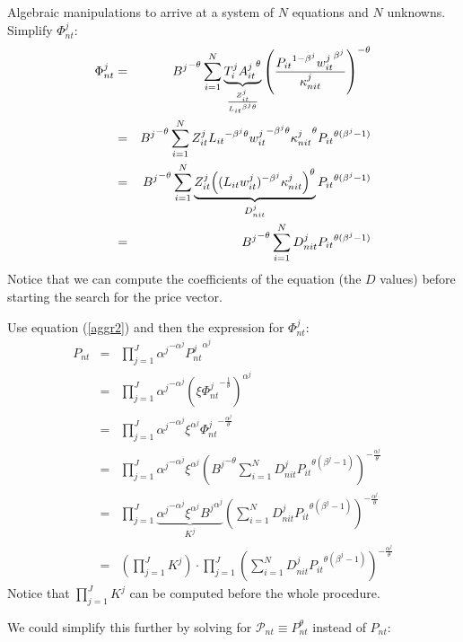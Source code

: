 \documentclass[12pt]{article}
\begin{document}
Algebraic manipulations to arrive at a system of $N$ equations and $N$
unknowns. Simplify $\Phi_{nt}^j:$ 
\begin{eqnarray*}
\Phi_{nt}^j &=& {B^j}^{-\theta} \sum_{i = 1}^N \underbrace{T_i^j {A_{it}^j}%
^{\theta}}_{\frac{Z_{it}^j}{{L_{it}}^{\beta^j\theta}}} \left(\frac{{P_{it}}%
^{1 - \beta^j} {w_{it}^j}^{\beta^j}}{\kappa_{nit}^j}\right)^{-\theta} \\
&=& {B^j}^{-\theta} \sum_{i = 1}^N Z_{it}^j {L_{it}}^{- \beta^j\theta} {%
w_{it}^j}^{-\beta^j\theta} {\kappa_{nit}^j}^{\theta}{P_{it}}^{\theta(\beta^j
- 1)} \\
&=& {B^j}^{-\theta} \sum_{i = 1}^N \underbrace{Z_{it}^j {%
\left((L_{it}w_{it}^j)^{- \beta^j} \kappa_{nit}^j\right)}^{\theta}}%
_{D_{nit}^j} {P_{it}}^{\theta(\beta^j - 1)} \\
&=& {B^j}^{-\theta} \sum_{i = 1}^N D_{nit}^j{P_{it}}^{\theta(\beta^j - 1)}
\end{eqnarray*}
Notice that we can compute the coefficients of the equation (the $D$ values)
before starting the search for the price vector.

Use equation (\ref{aggr2}) and then the expression for $\Phi_{nt}^j$: 
\begin{eqnarray*}
P_{nt} &=& \prod_{j = 1}^J {\alpha^j}^{- \alpha^j} {P_{nt}^j}^{\alpha^j} \\
&=& \prod_{j = 1}^J {\alpha^j}^{- \alpha^j} \left(\xi {\Phi_{nt}^j}^{-\frac{1%
}{\theta}}\right)^{\alpha^j} \\
&=& \prod_{j = 1}^J {\alpha^j}^{- \alpha^j} \xi^{\alpha^j} {\Phi_{nt}^j}^{-%
\frac{\alpha^j}{\theta}} \\
&=& \prod_{j = 1}^J {\alpha^j}^{- \alpha^j} \xi^{\alpha^j} \left({B^j}%
^{-\theta} \sum_{i = 1}^N D_{nit}^j{P_{it}}^{\theta(\beta^j - 1)}\right)^{-%
\frac{\alpha^j}{\theta}} \\
&=& \prod_{j = 1}^J \underbrace{{\alpha^j}^{- \alpha^j} \xi^{\alpha^j} {B^j}%
^{\alpha^j}}_{K^j} \left(\sum_{i = 1}^N D_{nit}^j{P_{it}}^{\theta(\beta^j -
1)}\right)^{-\frac{\alpha^j}{\theta}} \\
&=& \left( \prod_{j = 1}^J K^j \right) \cdot \prod_{j = 1}^J \left(\sum_{i =
1}^N D_{nit}^j {P_{it}}^{\theta(\beta^j - 1)}\right)^{-\frac{\alpha^j}{\theta%
}}
\end{eqnarray*}
Notice that $\prod_{j = 1}^J K^j$ can be computed before the whole procedure.

We could simplify this further by solving for $\mathcal{P}_{nt} \equiv
P_{nt}^{\theta}$ instead of $P_{nt}$:
\end{document}
